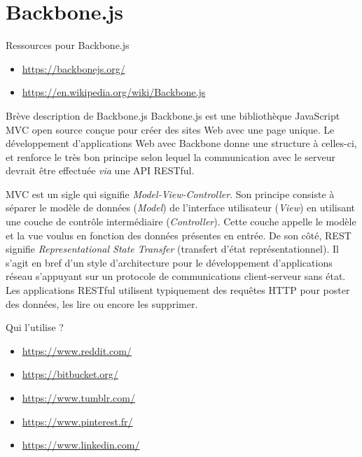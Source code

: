 \documentclass[presentation]{beamer}
\begin{document}
\section{Backbone.js}
\label{sec:org9ca3b9a}

\begin{frame}[label={sec:org1f62aae}]{Ressources pour Backbone.js}
\begin{itemize}
\item \url{https://backbonejs.org/}
\item \url{https://en.wikipedia.org/wiki/Backbone.js}
\end{itemize}
\end{frame}


\begin{frame}[label={sec:orge261c16}]{Brève description de Backbone.js}
Backbone.js est une bibliothèque JavaScript MVC open source conçue
pour créer des sites Web avec une page unique. Le développement
d'applications Web avec Backbone donne une structure à celles-ci, et
renforce le très bon principe selon lequel la communication avec le
serveur devrait être effectuée \emph{via} une API RESTful.

MVC est un sigle qui signifie \emph{Model-View-Controller}. Son principe
consiste à séparer le modèle de données (\emph{Model}) de l'interface
utilisateur (\emph{View}) en utilisant une couche de contrôle
intermédiaire (\emph{Controller}). Cette couche appelle le modèle et la
vue voulus en fonction des données présentes en entrée. De son côté,
REST signifie \emph{Representational State Transfer} (transfert d'état
représentationnel). Il s'agit en bref d'un style d'architecture pour
le développement d'applications réseau s'appuyant sur un protocole
de communications client-serveur sans état. Les applications RESTful
utilisent typiquement des requêtes HTTP pour poster des données, les
lire ou encore les supprimer.
\end{frame}


\begin{frame}[label={sec:org236fbff}]{Qui l'utilise ?}
\begin{itemize}
\item \url{https://www.reddit.com/}
\item \url{https://bitbucket.org/}
\item \url{https://www.tumblr.com/}
\item \url{https://www.pinterest.fr/}
\item \url{https://www.linkedin.com/}
\end{itemize}
\end{frame}
\end{document}
